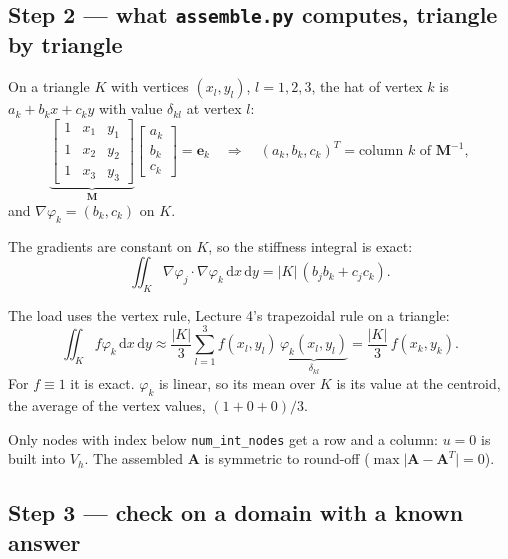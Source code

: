 \documentclass[11pt]{article}
\newcommand{\dxdy}{\,\mathrm{d}x\,\mathrm{d}y}
\newcommand{\abs}[1]{\lvert #1\rvert}
\newcommand{\grad}{\nabla}
\begin{document}
\subsection*{Step 2 --- what \texttt{assemble.py} computes, triangle by triangle}

\begin{steps}
\item On a triangle $K$ with vertices $(x_{l},y_{l})$, $l=1,2,3$, the hat of
      vertex $k$ is $a_{k}+b_{k}x+c_{k}y$ with value $\delta_{kl}$ at vertex
      $l$:
\begin{equation}\label{eq:hatK}
  \underbrace{\begin{bmatrix}1&x_{1}&y_{1}\\1&x_{2}&y_{2}\\1&x_{3}&y_{3}\end{bmatrix}}_{\bm M}
  \begin{bmatrix}a_{k}\\b_{k}\\c_{k}\end{bmatrix}=\bm e_{k}
  \quad\Longrightarrow\quad
  (a_{k},b_{k},c_{k})^{T}=\text{column }k\text{ of }\bm M^{-1},
\end{equation}
      and $\grad\varphi_{k}=(b_{k},c_{k})$ on $K$.
\item The gradients are constant on $K$, so the stiffness integral is exact:
\begin{equation}\label{eq:AK}
  \iint_{K}\grad\varphi_{j}\cdot\grad\varphi_{k}\dxdy=\abs{K}\,(b_{j}b_{k}+c_{j}c_{k}) .
\end{equation}
\item The load uses the vertex rule, Lecture 4's trapezoidal rule on a
      triangle:
\begin{equation}\label{eq:bK}
  \iint_{K}f\varphi_{k}\dxdy\approx\frac{\abs{K}}{3}\sum_{l=1}^{3}f(x_{l},y_{l})\,
  \underbrace{\varphi_{k}(x_{l},y_{l})}_{\delta_{kl}}=\frac{\abs{K}}{3}\,f(x_{k},y_{k}) .
\end{equation}
      For $f\equiv1$ it is exact.  $\varphi_{k}$ is linear, so its mean over
      $K$ is its value at the centroid, the average of the vertex values,
      $(1+0+0)/3$.
\item Only nodes with index below \texttt{num\_int\_nodes} get a row and a
      column: $u=0$ is built into $V_{h}$.  The assembled $\bm A$ is
      symmetric to round-off ($\max\abs{\bm A-\bm A^{T}}=0$).
\end{steps}

\subsection*{Step 3 --- check on a domain with a known answer}
\end{document}
